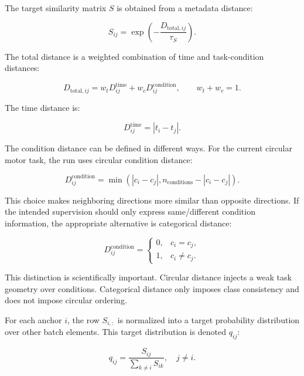 \documentclass[11pt]{article}
\begin{document}
The target similarity matrix $S$ is obtained from a metadata distance:

\begin{equation}
S_{ij} = \exp\left(-\frac{D_{\text{total},ij}}{\tau_S}\right).
\end{equation}

The total distance is a weighted combination of time and task-condition
distances:

\begin{equation}
D_{\text{total},ij}
=
w_t D^{\text{time}}_{ij}
+
w_c D^{\text{condition}}_{ij},
\qquad
w_t+w_c=1.
\end{equation}

The time distance is:

\begin{equation}
D^{\text{time}}_{ij} = |t_i-t_j|.
\end{equation}

The condition distance can be defined in different ways. For the current
circular motor task, the run uses circular condition distance:

\begin{equation}
D^{\text{condition}}_{ij}
=
\min\left(
|c_i-c_j|,
n_{\text{conditions}}-|c_i-c_j|
\right).
\end{equation}

This choice makes neighboring directions more similar than opposite
directions. If the intended supervision should only express same/different
condition information, the appropriate alternative is categorical distance:

\begin{equation}
D^{\text{condition}}_{ij}
=
\begin{cases}
0, & c_i=c_j,\\
1, & c_i\ne c_j.
\end{cases}
\end{equation}

This distinction is scientifically important. Circular distance injects a weak
task geometry over conditions. Categorical distance only imposes class consistency
and does not impose circular ordering.

For each anchor $i$, the row $S_{i,:}$ is normalized into a target probability
distribution over other batch elements. This target distribution is denoted
$q_{ij}$:

\begin{equation}
q_{ij} =
\frac{S_{ij}}{\sum_{k \ne i} S_{ik}},
\quad j \ne i.
\end{equation}
\end{document}
